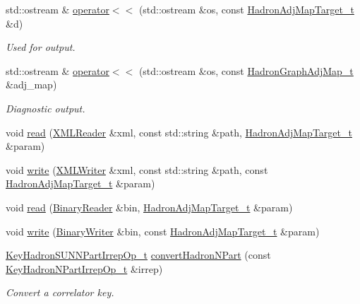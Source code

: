 \begin{DoxyCompactItemize}
std\+::ostream \& \mbox{\hyperlink{namespaceHadron_ad9b3f6b8246d630d96e54032def25900}{operator$<$$<$}} (std\+::ostream \&os, const \mbox{\hyperlink{structHadron_1_1HadronAdjMapTarget__t}{Hadron\+Adj\+Map\+Target\+\_\+t}} \&d)
\begin{DoxyCompactList}\small\item\em Used for output. \end{DoxyCompactList}\item 
std\+::ostream \& \mbox{\hyperlink{namespaceHadron_aefc74b3ac5cc28e73ed7a9e24b032449}{operator$<$$<$}} (std\+::ostream \&os, const \mbox{\hyperlink{namespaceHadron_ad6387ffed6a1bf53021dce29b71d3a04}{Hadron\+Graph\+Adj\+Map\+\_\+t}} \&adj\+\_\+map)
\begin{DoxyCompactList}\small\item\em Diagnostic output. \end{DoxyCompactList}\item 
void \mbox{\hyperlink{namespaceHadron_a9a69bb90cd1c62da66808573864f7cd1}{read}} (\mbox{\hyperlink{classADATXML_1_1XMLReader}{X\+M\+L\+Reader}} \&xml, const std\+::string \&path, \mbox{\hyperlink{structHadron_1_1HadronAdjMapTarget__t}{Hadron\+Adj\+Map\+Target\+\_\+t}} \&param)
\item 
void \mbox{\hyperlink{namespaceHadron_add6d43a3a15c934d9c3e98989588d22e}{write}} (\mbox{\hyperlink{classADATXML_1_1XMLWriter}{X\+M\+L\+Writer}} \&xml, const std\+::string \&path, const \mbox{\hyperlink{structHadron_1_1HadronAdjMapTarget__t}{Hadron\+Adj\+Map\+Target\+\_\+t}} \&param)
\item 
void \mbox{\hyperlink{namespaceHadron_a2e69cce268ca3e4d68bc0954eb3f8065}{read}} (\mbox{\hyperlink{classADATIO_1_1BinaryReader}{Binary\+Reader}} \&bin, \mbox{\hyperlink{structHadron_1_1HadronAdjMapTarget__t}{Hadron\+Adj\+Map\+Target\+\_\+t}} \&param)
\item 
void \mbox{\hyperlink{namespaceHadron_a97d7de65e3fea244c875c2cb76decfda}{write}} (\mbox{\hyperlink{classADATIO_1_1BinaryWriter}{Binary\+Writer}} \&bin, const \mbox{\hyperlink{structHadron_1_1HadronAdjMapTarget__t}{Hadron\+Adj\+Map\+Target\+\_\+t}} \&param)
\item 
\mbox{\hyperlink{structHadron_1_1KeyHadronSUNNPartIrrepOp__t}{Key\+Hadron\+S\+U\+N\+N\+Part\+Irrep\+Op\+\_\+t}} \mbox{\hyperlink{namespaceHadron_ac6bc3e869d76d287be23c6d20cb9c104}{convert\+Hadron\+N\+Part}} (const \mbox{\hyperlink{structHadron_1_1KeyHadronNPartIrrepOp__t}{Key\+Hadron\+N\+Part\+Irrep\+Op\+\_\+t}} \&irrep)
\begin{DoxyCompactList}\small\item\em Convert a correlator key. \end{DoxyCompactList}\item 

\end{DoxyCompactItemize}
